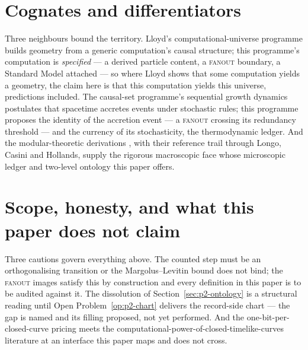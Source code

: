 \documentclass[11pt,a4paper]{article}
\newcommand{\fanout}{\textsc{fanout}}
\begin{document}
\section{Cognates and differentiators}
\label{sec:p2-cognates}


Three neighbours bound the territory. Lloyd's computational-universe programme
\autocite{lloyd2005quantum} builds geometry from a generic computation's causal structure; this
programme's computation is \emph{specified} --- a derived particle content, a \fanout{} boundary,
a Standard Model attached --- so where Lloyd shows that some computation yields a geometry, the
claim here is that this computation yields this universe, predictions included. The causal-set
programme's sequential growth dynamics \autocite{rideoutsorkin2000} postulates that spacetime
accretes events under stochastic rules; this programme proposes the identity of the accretion
event --- a \fanout{} crossing its redundancy threshold --- and the currency of its
stochasticity, the thermodynamic ledger. And the modular-theoretic derivations
\autocite{doraumuch2026relative}, with their reference trail through Longo, Casini and Hollands,
supply the rigorous macroscopic face whose microscopic ledger and two-level ontology this paper
offers.

\section{Scope, honesty, and what this paper does not claim}
\label{sec:p2-scope}


Three cautions govern everything above. The counted step must be an orthogonalising transition or
the Margolus--Levitin bound does not bind; the \fanout{} images satisfy this by construction and
every definition in this paper is to be audited against it. The dissolution of
Section~\ref{sec:p2-ontology} is a structural reading until Open Problem~\ref{op:p2-chart}
delivers the record-side chart --- the gap is named and its filling proposed, not yet performed.
And the one-bit-per-closed-curve pricing meets the computational-power-of-closed-timelike-curves
literature at an interface this paper maps and does not cross.

\renewcommand{\listtheoremname}{Open Problems of Paper II}
\listoftheorems[ignoreall, show={openproblem}]

\printbibliography
\end{document}
